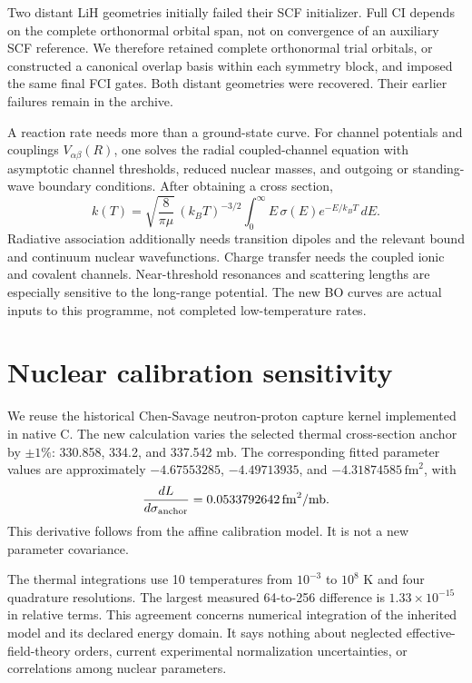 \documentclass[
  10pt,
]{article}
\begin{document}
Two distant LiH geometries initially failed their SCF initializer. Full
CI depends on the complete orthonormal orbital span, not on convergence
of an auxiliary SCF reference. We therefore retained complete
orthonormal trial orbitals, or constructed a canonical overlap basis
within each symmetry block, and imposed the same final FCI gates. Both
distant geometries were recovered. Their earlier failures remain in the
archive.

A reaction rate needs more than a ground-state curve. For channel
potentials and couplings \(V_{\alpha\beta}(R)\), one solves the radial
coupled-channel equation with asymptotic channel thresholds, reduced
nuclear masses, and outgoing or standing-wave boundary conditions. After
obtaining a cross section, \[
k(T)=\sqrt{\frac{8}{\pi\mu}}\,(k_BT)^{-3/2}
\int_0^\infty E\,\sigma(E)e^{-E/k_BT}\,dE.
\] Radiative association additionally needs transition dipoles and the
relevant bound and continuum nuclear wavefunctions. Charge transfer
needs the coupled ionic and covalent channels. Near-threshold resonances
and scattering lengths are especially sensitive to the long-range
potential. The new BO curves are actual inputs to this programme, not
completed low-temperature rates.

\hypertarget{nuclear-calibration-sensitivity}{%
\section{Nuclear calibration
sensitivity}\label{nuclear-calibration-sensitivity}}

We reuse the historical Chen-Savage neutron-proton capture kernel
implemented in native C. The new calculation varies the selected thermal
cross-section anchor by \(\pm1\%\): 330.858, 334.2, and 337.542 mb. The
corresponding fitted parameter values are approximately \(-4.67553285\),
\(-4.49713935\), and \(-4.31874585\,\mathrm{fm}^2\), with \[
\frac{dL}{d\sigma_{\rm anchor}}
=0.0533792642\,\mathrm{fm}^2/\mathrm{mb}.
\] This derivative follows from the affine calibration model. It is not
a new parameter covariance.

The thermal integrations use 10 temperatures from \(10^{-3}\) to
\(10^8\) K and four quadrature resolutions. The largest measured
64-to-256 difference is \(1.33\times10^{-15}\) in relative terms. This
agreement concerns numerical integration of the inherited model and its
declared energy domain. It says nothing about neglected
effective-field-theory orders, current experimental normalization
uncertainties, or correlations among nuclear parameters.
\end{document}
